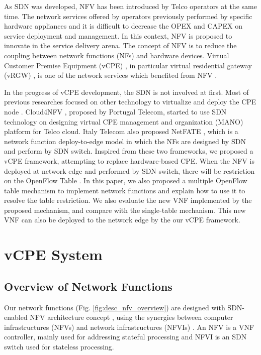 \documentclass[conference]{IEEEtran}
\begin{document}
As SDN was developed, NFV \cite{nfv-wp, etsi-nfv-archi, nfv-survey} has been introduced by Telco operators at the same time.
The network services offered by operators previously performed by specific hardware appliances and it is difficult to decrease the OPEX and CAPEX on service deployment and management.
In this context, NFV is proposed to innovate in the service delivery arena.
The concept of NFV is to reduce the coupling between network functions (NFs) and hardware devices.
Virtual Customer Premise Equipment (vCPE) \cite{nec-vcpe, vcpe-enhance}, in particular virtual residential gateway (vRGW) \cite{nfv-home}, is one of the network services which benefited from NFV \cite{etsi-nfv-usecase}.

In the progress of vCPE development, the SDN is not involved at first.
Most of previous researches focused on other technology to virtualize and deploy the CPE node \cite{virtual-rg, security-vgw, design-vrgw, nfv-hgw-surrogate, linux-cpe, nfv-resoure-contrain-cpe}.
Cloud4NFV \cite{cloud4nfv, cloud4nfv-telco}, proposed by Portugal Telecom, started to use SDN technology on designing virtual CPE management and organization (MANO) platform for Telco cloud.
Italy Telecom also proposed NetFATE \cite{netfate}, which is a network function deploy-to-edge model in which the NFs are designed by SDN and perform by SDN switch. Inspired from these two frameworks, we proposed a vCPE framework, attempting to replace hardware-based CPE.
When the NFV is deployed at network edge and performed by SDN switch, there will be restriction on the OpenFlow Table \cite{multiple-flow-table}.
In this paper, we also proposed a multiple OpenFlow table mechanism to implement network functions and explain how to use it to resolve the table restriction.
We also evaluate the new VNF implemented by the proposed mechanism, and compare with the single-table mechanism.
This new VNF can also be deployed to the network edge by the our vCPE framework.





\section{vCPE System}
\subsection{Overview of Network Functions} \label{ssec:desc_nfv_overview}
Our network functions (Fig. \ref{fig:desc_nfv_overview}) are designed with SDN-enabled NFV architecture concept \cite{sdn-enabled}, using the synergies between computer infrastructures (NFVs) and network infrastructures (NFVIs) \cite{nfv2014-v121, nfv2015}.
An NFV is a VNF controller, mainly used for addressing stateful processing and NFVI is an SDN switch used for stateless processing.
\end{document}
